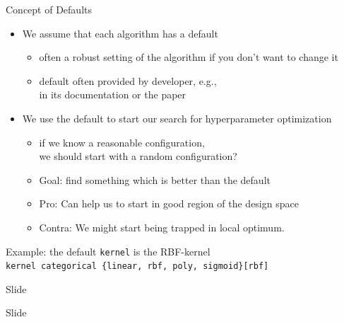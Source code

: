 \begin{frame}[c]{Concept of Defaults}

\begin{itemize}
  \item We assume that each algorithm has a default
  \begin{itemize}
    \item often a robust setting of the algorithm if you don't want to change it
    \item default often provided by developer, e.g.,\\
   		  in its documentation or the paper
  \end{itemize}
  \item We use the default to start our search for hyperparameter optimization
  \begin{itemize}
    \item if we know a reasonable configuration,\\ we should start with a random configuration?
    \item Goal: find something which is better than the default
    \item Pro: Can help us to start in good region of the design space
    \item Contra: We might start being trapped in local optimum.
  \end{itemize}
\end{itemize}

Example: the default \texttt{kernel} is the RBF-kernel\\
\texttt{kernel categorical \{linear, rbf, poly, sigmoid\}[rbf]}

\end{frame}
\begin{frame}[c]{Slide}


\end{frame}
\begin{frame}[c]{Slide}


\end{frame}
